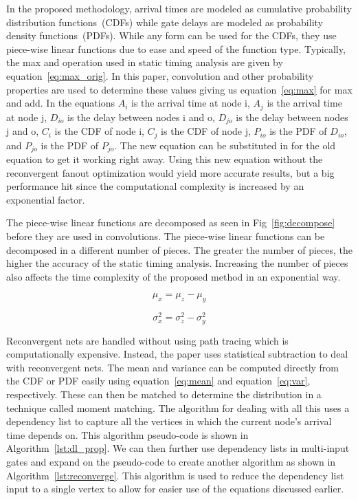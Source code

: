 \documentclass[journal,12pt]{IEEEtran}
\begin{document}
In the proposed methodology, arrival times are modeled as cumulative
probability distribution functions~(CDFs) while gate delays are
modeled as probability density functions~(PDFs). While any form can be
used for the CDFs, they use piece-wise linear functions due to ease and
speed of the function type. Typically, the max and operation
used in static timing analysis are given by equation~\ref{eq:max_orig}. In this paper,
convolution and other probability properties are used to determine
these values giving us equation~\ref{eq:max} for max and add. In the equations $A_i$ is the
arrival time at node i,  $A_j$ is the arrival time at node j, $D_{io}$
is the delay between nodes i and o, $D_{jo}$ is the delay between
nodes j and o, $C_i$ is the CDF of node i, $C_j$ is the CDF of node
j, $P_{io}$ is the PDF of $D_{io}$, and $P_{jo}$ is the PDF
of $P_{jo}$. The new equation can be substituted in for the old
equation to get it working right away. Using this new equation
without the reconvergent fanout optimization would yield more accurate
results, but a big performance hit since the computational complexity
is increased by an exponential factor.

The piece-wise linear functions are decomposed as seen in
Fig~\ref{fig:decompose} before they are used in convolutions. The
piece-wise linear functions can be decomposed in a different number of
pieces. The greater the number of pieces, the higher the accuracy of
the static timing analysis. Increasing the number of pieces also
affects the time complexity of the proposed method in an exponential
way.

\begin{equation}\label{eq:mean}
  \mu_x = \mu_z - \mu_y
\end{equation}

\begin{equation}\label{eq:var}
  \sigma_x^2 = \sigma_z^2 - \sigma_y^2
\end{equation}

Reconvergent nets are handled without using path tracing which is
computationally expensive. Instead, the paper uses statistical
subtraction to deal with reconvergent nets. The mean and variance can
be computed directly from the CDF or PDF easily using equation~\ref{eq:mean} and
equation~\ref{eq:var}, respectively. These can then be matched to
determine the distribution in a technique called moment matching. The
algorithm for dealing with all this uses a dependency list to capture
all the vertices in which the current node's arrival time depends
on. This algorithm pseudo-code is shown in Algorithm~\ref{lst:dl_prop}.
We can then further use dependency lists in multi-input gates and expand on
the pseudo-code to create another algorithm as shown in
Algorithm~\ref{lst:reconverge}. This algorithm is used to reduce the
dependency list input to a single vertex to allow for easier use of
the equations discussed earlier.
\end{document}
